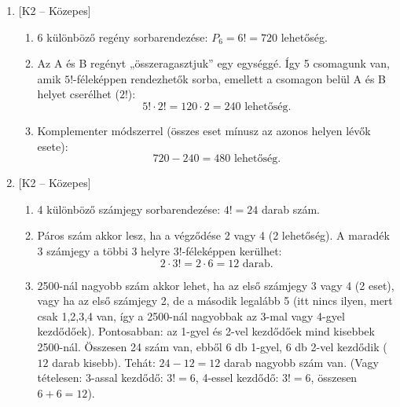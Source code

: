 \documentclass[12pt,a4paper]{article}
\begin{document}
\begin{enumerate}[label=\arabic*., leftmargin=*]
    \vspace{0.3cm}

    \item \textsf{\small [K2 – Közepes]}
    \begin{enumerate}[label=\alph*)]
        \item 6 különböző regény sorbarendezése: $P_6 = 6! = 720$ lehetőség.
        \item Az A és B regényt „összeragasztjuk” egy egységgé. Így 5 csomagunk van, amik $5!$-féleképpen rendezhetők sorba, emellett a csomagon belül A és B helyet cserélhet ($2!$):
        \[
        5! \cdot 2! = 120 \cdot 2 = 240 \text{ lehetőség.}
        \]
        \item Komplementer módszerrel (összes eset mínusz az azonos helyen lévők esete):
        \[
        720 - 240 = 480 \text{ lehetőség.}
        \]
    \end{enumerate}

    \vspace{0.3cm}

    \item \textsf{\small [K2 – Közepes]}
    \begin{enumerate}[label=\alph*)]
        \item 4 különböző számjegy sorbarendezése: $4! = 24$ darab szám.
        \item Páros szám akkor lesz, ha a végződése 2 vagy 4 (2 lehetőség). A maradék 3 számjegy a többi 3 helyre $3!$-féleképpen kerülhet:
        \[
        2 \cdot 3! = 2 \cdot 6 = 12 \text{ darab.}
        \]
        \item 2500-nál nagyobb szám akkor lehet, ha az első számjegy 3 vagy 4 (2 eset), vagy ha az első számjegy 2, de a második legalább 5 (itt nincs ilyen, mert csak 1,2,3,4 van, így a 2500-nál nagyobbak az 3-mal vagy 4-gyel kezdődőek). Pontosabban: az 1-gyel és 2-vel kezdődőek mind kisebbek 2500-nál. Összesen 24 szám van, ebből 6 db 1-gyel, 6 db 2-vel kezdődik ($12$ darab kisebb). Tehát: $24 - 12 = 12$ darab nagyobb szám van. (Vagy tételesen: 3-assal kezdődő: $3! = 6$, 4-essel kezdődő: $3! = 6$, összesen $6+6=12$).
    \end{enumerate}

    \vspace{0.3cm}


\end{enumerate}
\end{document}

